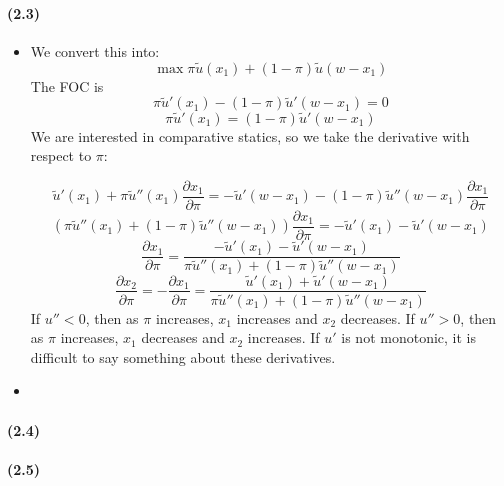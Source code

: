 \documentclass[10pt,letter]{article}
\begin{document}
\paragraph{(2.3)}
\begin{itemize}
\item We convert this into:
\[ \max \pi \tilde{u}(x_1) + (1-\pi) \tilde{u}(w - x_1) \]
The FOC is
\[ \pi \tilde{u}'(x_1) - (1-\pi)\tilde{u}'(w-x_1) = 0 \]
\[ \pi \tilde{u}'(x_1) = (1-\pi)\tilde{u}'(w-x_1)  \]
We are interested in comparative statics, so we take the derivative with respect to $\pi$:

\[ \tilde{u}'(x_1) + \pi \tilde{u}''(x_1) \frac{\partial x_1}{\partial \pi} = -\tilde{u}'(w-x_1) - (1-\pi)\tilde{u}''(w-x_1)\frac{\partial x_1}{\partial \pi} \]
\[ (\pi \tilde{u}''(x_1) + (1-\pi)\tilde{u}''(w-x_1)) \frac{\partial x_1}{\partial \pi} = -\tilde{u}'(x_1)-\tilde{u}'(w-x_1)  \]
\[ \frac{\partial x_1}{\partial \pi} =\frac{-\tilde{u}'(x_1)-\tilde{u}'(w-x_1) }{\pi \tilde{u}''(x_1) + (1-\pi)\tilde{u}''(w-x_1)} \]
\[ \frac{\partial x_2}{\partial \pi} = -\frac{\partial x_1}{\partial \pi} = \frac{\tilde{u}'(x_1)+\tilde{u}'(w-x_1) }{\pi \tilde{u}''(x_1) + (1-\pi)\tilde{u}''(w-x_1)} \]
If $u'' < 0$, then as $\pi$ increases, $x_1$ increases and $x_2$ decreases. If $u'' > 0$, then as $\pi$ increases, $x_1$ decreases and $x_2$ increases. If $u'$ is not monotonic, it is difficult to say something about these derivatives.

\item

\end{itemize}
\paragraph{(2.4)}
\paragraph{(2.5)}
\end{document}

